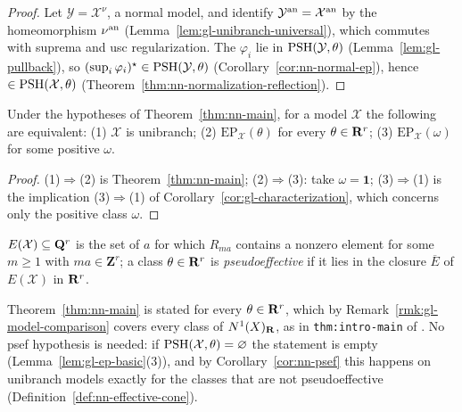 \begin{proof}
Let $\mathcal Y=\mathcal X^\nu$, a normal model, and identify $\mathcal Y^{\mathrm{an}}=\mathcal X^{\mathrm{an}}$ by the homeomorphism $\nu^{\mathrm{an}}$ (Lemma~\ref{lem:gl-unibranch-universal}), which
commutes with suprema and usc regularization. The $\varphi_i$ lie in $\operatorname{PSH}(\mathcal Y,\theta)$ (Lemma~\ref{lem:gl-pullback}), so
$(\sup_i\varphi_i)^\star\in\operatorname{PSH}(\mathcal Y,\theta)$ (Corollary~\ref{cor:nn-normal-ep}), hence $\in\operatorname{PSH}(\mathcal X,\theta)$ (Theorem~\ref{thm:nn-normalization-reflection}).
\end{proof}

\begin{corollary}\label{cor:nn-characterization}
\leanok
{}
Under the hypotheses of Theorem~\ref{thm:nn-main}, for a model $\mathcal X$ the following are equivalent: (1) $\mathcal X$ is unibranch; (2)
$\mathrm{EP}_{\mathcal X}(\theta)$ for every $\theta\in\mathbf{R}^r$; (3) $\mathrm{EP}_{\mathcal X}(\omega)$ for some positive $\omega$.
\end{corollary}

\begin{proof}
(1)$\Rightarrow$(2) is Theorem~\ref{thm:nn-main}; (2)$\Rightarrow$(3): take $\omega=\mathbf1$; (3)$\Rightarrow$(1) is the implication (3)$\Rightarrow$(1) of
Corollary~\ref{cor:gl-characterization}, which concerns only the positive class $\omega$.
\end{proof}

\begin{definition}\label{def:nn-effective-cone}
\leanok
{}
$E(\mathcal X)\subseteq\mathbf{Q}^r$ is the set of $a$ for which $R_{ma}$ contains a nonzero element for some $m\ge1$ with $ma\in\mathbf Z^r$; a class $\theta\in\mathbf{R}^r$ is
\emph{pseudoeffective} if it lies in the closure $\overline E$ of $E(\mathcal X)$ in $\mathbf{R}^r$.
\end{definition}

\begin{remark}\label{rmk:nn-well-posed}
\notready
{}
Theorem~\ref{thm:nn-main} is stated for every $\theta\in\mathbf{R}^r$, which by Remark~\ref{rmk:gl-model-comparison} covers every class of $N^1(X)_{\mathbf{R}}$, as in
\texttt{thm:intro-main} of \cite{FHX}. No psef hypothesis is needed: if $\operatorname{PSH}(\mathcal X,\theta)=\varnothing$ the statement is empty
(Lemma~\ref{lem:gl-ep-basic}(3)), and by Corollary~\ref{cor:nn-psef} this happens on unibranch models exactly for the classes that are not pseudoeffective
(Definition~\ref{def:nn-effective-cone}).
\end{remark}

